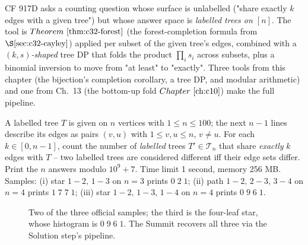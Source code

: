 
\begin{notebox}
CF 917D asks a counting question whose surface is unlabelled ("share
exactly \(k\) edges with a given tree") but whose answer space is
\emph{labelled trees on \([n]\)}.  The tool is \(\thmref{c32-forest}\) (the
forest-completion formula from \(\secref{c32-cayley}\)) applied per subset
of the given tree's edges, combined with a \((k,s)\)\emph{-shaped} tree DP
that folds the product \(\prod_i s_i\) across subsets, plus a binomial
inversion to move from "at least" to "exactly".  Three tools from this
chapter (the bijection's completion corollary, a tree DP, and modular
arithmetic) and one from Ch.~13 (the bottom-up fold \(\chref{c10}\)) make
the full pipeline.
\end{notebox}


\begin{problemstatement}
A labelled tree \(T\) is given on \(n\) vertices with \(1\le n\le 100\); the
next \(n-1\) lines describe its edges as pairs \((v,u)\) with \(1\le v,u\le
n\), \(v\ne u\).  For each \(k\in[0,n-1]\), count the number of
\emph{labelled} trees \(T'\in\mathcal{T}_n\) that share \emph{exactly} \(k\)
edges with \(T\) -- two labelled trees are considered different iff their
edge sets differ.  Print the \(n\) answers modulo \(10^9+7\).  Time limit
1 second, memory 256 MB.  Samples: (i) star \(1\!-\!2,\, 1\!-\!3\) on
\(n=3\) prints \(0\;2\;1\); (ii) path \(1\!-\!2,\, 2\!-\!3,\, 3\!-\!4\) on
\(n=4\) prints \(1\;7\;7\;1\); (iii) star \(1\!-\!2,\, 1\!-\!3,\, 1\!-\!4\)
on \(n=4\) prints \(0\;9\;6\;1\).
\end{problemstatement}

\begin{figure}[H]
\centering
{}
\caption{Two of the three official samples; the third is the four-leaf star,
whose histogram is \(0\;9\;6\;1\).  The Summit recovers all three via the Solution step's pipeline.}
\label{fig:c32-summit}
\end{figure}

